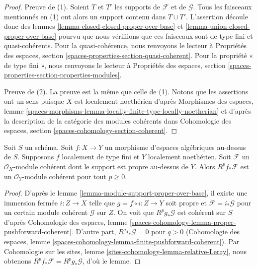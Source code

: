 \begin{proof}
Preuve de (1). Soient $T$ et $T'$ les supports de $\mathcal{F}$
et de $\mathcal{G}$. Tous les faisceaux mentionnés en (1)
ont alors un support contenu dans $T \cup T'$. L'assertion découle donc
des lemmes \ref{lemma-closed-closed-proper-over-base} et
\ref{lemma-union-closed-proper-over-base}
pourvu que nous vérifiions que ces faisceaux sont de type fini
et quasi-cohérents.
Pour la quasi-cohérence, nous renvoyons le lecteur à
Propriétés des espaces, section \ref{spaces-properties-section-quasi-coherent}.
Pour la propriété « de type fini », nous renvoyons le lecteur à
Propriétés des espaces, section
\ref{spaces-properties-section-properties-modules}.

\medskip\noindent
Preuve de (2). La preuve est la même que celle de (1). Notons que
les assertions ont un sens puisque $X$ est localement noethérien d'après
Morphismes des espaces, lemme
\ref{spaces-morphisms-lemma-locally-finite-type-locally-noetherian}
et d'après la description de la catégorie des modules cohérents dans
Cohomologie des espaces, section \ref{spaces-cohomology-section-coherent}.
\end{proof}

\begin{lemma}
\label{lemma-support-proper-over-base-pushforward}
Soit $S$ un schéma. Soit $f : X \to Y$ un morphisme d'espaces algébriques
au-dessus de $S$. Supposons $f$ localement de type fini et $Y$ localement noethérien.
Soit $\mathcal{F}$ un $\mathcal{O}_X$-module cohérent dont le support
est propre au-dessus de $Y$. Alors $R^pf_*\mathcal{F}$ est un
$\mathcal{O}_Y$-module cohérent pour tout $p \geq 0$.
\end{lemma}

\begin{proof}
D'après le lemme \ref{lemma-module-support-proper-over-base},
il existe une immersion fermée $i : Z \to X$ telle que
$g = f \circ i : Z \to Y$ soit propre et
$\mathcal{F} = i_*\mathcal{G}$ pour un certain module cohérent $\mathcal{G}$
sur $Z$. On voit que $R^pg_*\mathcal{G}$
est cohérent sur $S$ d'après Cohomologie des espaces, lemme
\ref{spaces-cohomology-lemma-proper-pushforward-coherent}.
D'autre part, $R^qi_*\mathcal{G} = 0$ pour $q > 0$
(Cohomologie des espaces, lemme
\ref{spaces-cohomology-lemma-finite-pushforward-coherent}).
Par Cohomologie sur les sites, lemme \ref{sites-cohomology-lemma-relative-Leray},
nous obtenons $R^pf_*\mathcal{F} = R^pg_*\mathcal{G}$, d'où le lemme.
\end{proof}






